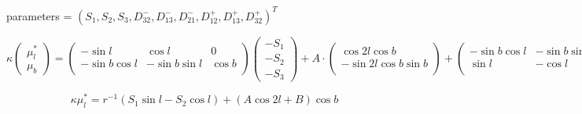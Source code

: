 \documentclass[onecolumn]{aa}   %
\begin{document}
parameters = $(S_1, S_2, S_3, D^-_{32}, D^-_{13}, D^-_{21}, D^+_{12}, D^+_{13}, D^+_{32})^T$

\[ \kappa
\left( \begin{array}{c}
 \mu_l^* \\
 \mu_b
\end{array} \right)
 = 
 \left( \begin{array}{ccc}
-\sin l              &  \cos l               &  0 \\
-\sin b \cos l   & -\sin b \sin l        &  \cos b \\
\end{array} \right)
\left( \begin{array}{c}
- S_1 \\
- S_2 \\
- S_3
\end{array} \right) 
 +  A \cdot
  \left( \begin{array}{c}
 \cos 2l \cos b \\
-\sin 2l  \cos b \sin b\\
\end{array} \right)
 +
 \left( \begin{array}{ccc}
-\sin b \cos l 	& -\sin b \sin l &  \cos  b \\
  \sin l                & -\cos l          &  0 \\
\end{array} \right)
\left( \begin{array}{c}
 0 \\
 0 \\
 B
\end{array} \right)
\] 

\begin{equation}\label{eqn: OortModel1}
\kappa\mu_l^* = r^{-1}(S_1 \sin l - S_2 \cos l) + (A \cos 2l + B)\cos b
\end{equation}
\end{document}

